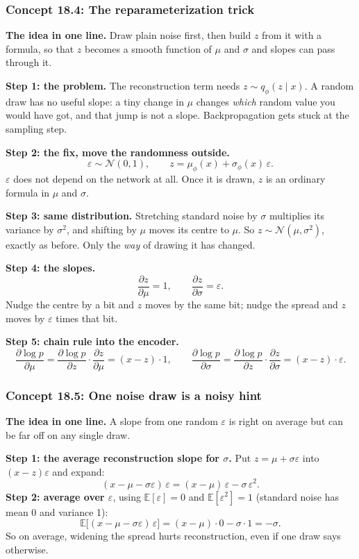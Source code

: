 \documentclass[12pt,a4paper]{article}
\begin{document}
\subsubsection{Concept 18.4: The reparameterization trick}\label{c18-4}

\textbf{The idea in one line.} Draw plain noise first, then build $z$ from it with a formula, so that $z$ becomes a smooth function of $\mu$ and $\sigma$ and slopes can pass through it.

\textbf{Step 1: the problem.} The reconstruction term needs $z\sim q_\phi(z\mid x)$. A random draw has no useful slope: a tiny change in $\mu$ changes \emph{which} random value you would have got, and that jump is not a slope. Backpropagation gets stuck at the sampling step.

\textbf{Step 2: the fix, move the randomness outside.}
\[
\varepsilon\sim\mathcal{N}(0,1),\qquad z=\mu_\phi(x)+\sigma_\phi(x)\,\varepsilon .
\]
$\varepsilon$ does not depend on the network at all. Once it is drawn, $z$ is an ordinary formula in $\mu$ and $\sigma$.

\textbf{Step 3: same distribution.} Stretching standard noise by $\sigma$ multiplies its variance by $\sigma^2$, and shifting by $\mu$ moves its centre to $\mu$. So $z\sim\mathcal{N}(\mu,\sigma^2)$, exactly as before. Only the \emph{way} of drawing it has changed.

\textbf{Step 4: the slopes.}
\[
\frac{\partial z}{\partial\mu}=1,\qquad\frac{\partial z}{\partial\sigma}=\varepsilon .
\]
Nudge the centre by a bit and $z$ moves by the same bit; nudge the spread and $z$ moves by $\varepsilon$ times that bit.

\textbf{Step 5: chain rule into the encoder.}
\[
\frac{\partial\log p}{\partial\mu}=\frac{\partial\log p}{\partial z}\cdot\frac{\partial z}{\partial\mu}=(x-z)\cdot1,\qquad
\frac{\partial\log p}{\partial\sigma}=\frac{\partial\log p}{\partial z}\cdot\frac{\partial z}{\partial\sigma}=(x-z)\cdot\varepsilon .
\]

\subsubsection{Concept 18.5: One noise draw is a noisy hint}\label{c18-5}

\textbf{The idea in one line.} A slope from one random $\varepsilon$ is right on average but can be far off on any single draw.

\textbf{Step 1: the average reconstruction slope for $\sigma$.} Put $z=\mu+\sigma\varepsilon$ into $(x-z)\varepsilon$ and expand:
\[
(x-\mu-\sigma\varepsilon)\,\varepsilon=(x-\mu)\,\varepsilon-\sigma\,\varepsilon^2 .
\]
\textbf{Step 2: average over $\varepsilon$}, using $\mathbb{E}[\varepsilon]=0$ and $\mathbb{E}[\varepsilon^2]=1$ (standard noise has mean 0 and variance 1):
\[
\mathbb{E}\big[(x-\mu-\sigma\varepsilon)\,\varepsilon\big]=(x-\mu)\cdot0-\sigma\cdot1=-\sigma .
\]
So on average, widening the spread hurts reconstruction, even if one draw says otherwise.
\end{document}
